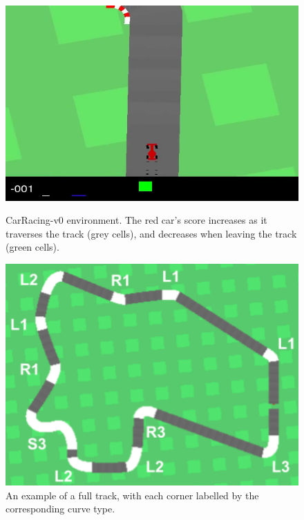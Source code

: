 \documentclass{article}
\begin{document}
\begin{figure}[!h]
\captionsetup{justification=centering}
\centering
\begin{minipage}[t]{.3\textwidth}
  \centering
  \includegraphics[width=\linewidth]{Graphics/carracing.jpg}
  \caption{CarRacing-v0 environment. The red car's score increases as
    it traverses the track (grey cells), and decreases when leaving the
  track (green cells).}
  \label{fig:carracing}
\end{minipage}
\hspace{.25cm}
\begin{minipage}[t]{.3\textwidth}
  \centering
  \includegraphics[width=\linewidth]{Graphics/curves.png}
  \caption{An example of a full track, with each corner labelled by the
    corresponding curve type.} 
  \label{fig:curves}

\end{minipage}
\end{figure}
\end{document}
